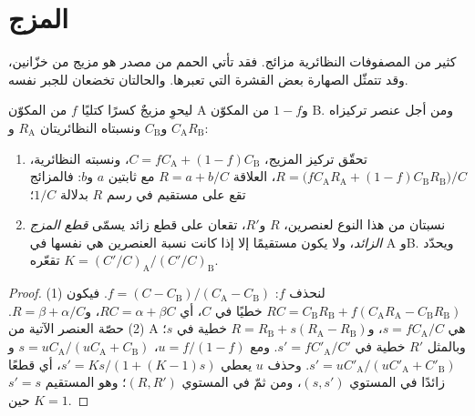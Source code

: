 \section{المزج}

كثير من المصفوفات النظائرية مزائج. فقد تأتي الحمم من مصدر هو
مزيج من خزّانين، وقد تتمثّل الصهارة بعض القشرة التي تعبرها.
والحالتان تخضعان للجبر نفسه.

\begin{proposition}\label{prop:b2:isotope-geochemistry:mixing}
ليحوِ مزيجٌ كسرًا كتليًا $f$ من المكوّن A و$1-f$ من المكوّن
B. ومن أجل عنصر تركيزاه $C_{\mathrm A}$ و$C_{\mathrm B}$ ونسبتاه
النظائريتان $R_{\mathrm A}$ و$R_{\mathrm B}$:
\begin{enumerate}
\item تحقّق تركيز المزيج، $C = fC_{\mathrm A} + (1-f)C_{\mathrm B}$،
ونسبته النظائرية،
$R = \bigl(fC_{\mathrm A}R_{\mathrm A} + (1-f)C_{\mathrm B}R_{\mathrm B}\bigr)/C$، العلاقة
$R = a + b/C$ مع ثابتين $a$ و$b$: فالمزائج تقع على مستقيم في
رسم $R$ بدلالة $1/C$؛
\item نسبتان من هذا النوع لعنصرين، $R$ و$R'$، تقعان على قطع زائد يسمّى
\emph{قطع المزج الزائد}، ولا يكون مستقيمًا إلا
إذا كانت نسبة العنصرين هي نفسها في A وB. ويحدّد تقعّره
$K = (C'/C)_{\mathrm A}/(C'/C)_{\mathrm B}$.
\end{enumerate}
\end{proposition}

\begin{proof}
(1) لنحذف $f$: $f = (C - C_{\mathrm B})/(C_{\mathrm A} - C_{\mathrm B})$. فيكون
$RC = C_{\mathrm B}R_{\mathrm B} + f(C_{\mathrm A}R_{\mathrm A} - C_{\mathrm B}R_{\mathrm
B})$ خطيًا في $C$، أي $RC = \alpha + \beta C$، و$R = \beta + \alpha/C$.
(2) حصّة العنصر الآتية من A هي $s = fC_{\mathrm A}/C$، و$R =
R_{\mathrm B} + s(R_{\mathrm A} - R_{\mathrm B})$ خطية في $s$؛ وبالمثل $R'$
خطية في $s' = fC'_{\mathrm A}/C'$. ومع $u = f/(1-f)$، $s = u C_{\mathrm
A}/(uC_{\mathrm A} + C_{\mathrm B})$ و$s' = uC'_{\mathrm A}/(uC'_{\mathrm A} +
C'_{\mathrm B})$. وحذف $u$ يعطي $s' = Ks/(1 + (K-1)s)$، أي قطعًا زائدًا في
المستوي $(s, s')$، ومن ثمّ في المستوي $(R, R')$؛ وهو المستقيم $s' = s$
حين $K = 1$.
\end{proof}

